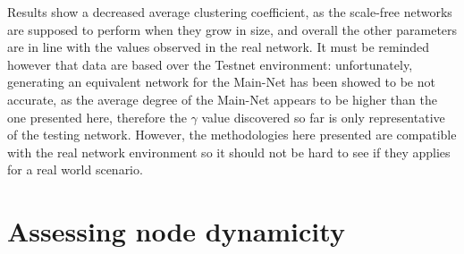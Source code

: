 	Results show a decreased average clustering coefficient, as the scale-free networks are supposed to perform when they grow in size, and overall the other parameters are in line with the values observed in the real network. It must be reminded however that data are based over the Testnet environment: unfortunately, generating an equivalent network for the Main-Net has been showed to be not accurate, as the average degree of the Main-Net appears to be higher than the one presented here, therefore the $\gamma$ value discovered so far is only representative of the testing network. However, the methodologies here presented are compatible with the real network environment so it should not be hard to see if they applies for a real world scenario.

	\section{Assessing node dynamicity}
	
